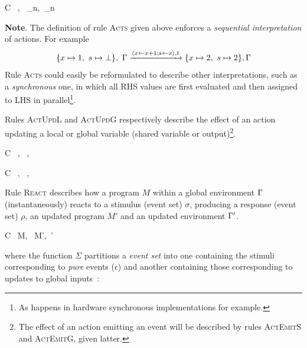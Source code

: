 {C \vdash\ \vars,\ \env {} \vars_n,\ \env_n}

\medskip \textbf{Note}. The definition of rule \textsc{Acts} given above enforces a \emph{sequential
  interpretation} of actions. For example
$$
\{x \mapsto 1,\ s \mapsto \bot \},\ \Gamma \xrightarrow{\langle x \gets x+1; s \gets x\rangle,t}
\{x \mapsto 2,\ s \mapsto 2 \}, \Gamma
$$
Rule \textsc{Acts} could easily be reformulated to describe other interpretations, such as a
\emph{synchronous} one, in which all RHS values are first evaluated
and then assigned to LHS in parallel\footnote{As happens in hardware synchronous implementations for
  example.}.


\medskip \step Rules \textsc{ActUpdL} and \textsc{ActUpdG} respectively describe the
effect of an action updating a local or global variable (shared variable or output)\footnote{The
  effect of an action emitting an event will be described by rules \textsc{ActEmitS} and \textsc{ActEmitG},
  given latter.}.

\begin{multicols}{2}
{C \vdash\ \vars,\ \env {} \vars[x\mapsto v],\ \env}

{C \vdash\ \vars,\ \env {} \vars,\ \env[x\mapsto v]}
\end{multicols}

\step Rule \textsc{React} describes how a program $M$ within a global environment $\Gamma$
(instantaneously) reacts to a stimulus (event set) $\sigma$, producing a response (event set)
$\rho$, an updated program $M'$ and an updated environment $\Gamma'$.

{C \vdash\ M,\ \env \xrightarrow[\rho_e]{\sigma} M',\ \env'}

where the function $\Sigma$ partitions a \emph{event set} into one containing the stimuli
corresponding to \emph{pure} events ($\epsilon$) and another containing those corresponding to updates to
global inputs~:

